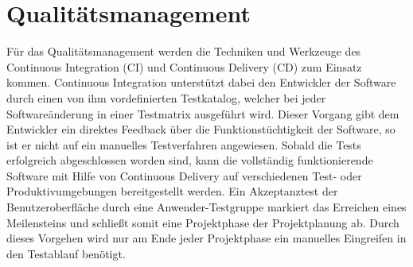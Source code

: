\section{Qualitätsmanagement}
Für das Qualitätsmanagement werden die Techniken und Werkzeuge des Continuous
Integration (CI) und Continuous Delivery (CD) zum Einsatz kommen. Continuous
Integration unterstützt dabei den Entwickler der Software durch einen von ihm
vordefinierten Testkatalog, welcher bei jeder Softwareänderung in einer
Testmatrix ausgeführt wird. Dieser Vorgang gibt dem Entwickler ein direktes
Feedback über die Funktionstüchtigkeit der Software, so ist er nicht auf ein
manuelles Testverfahren angewiesen. Sobald die Tests erfolgreich abgeschlossen
worden sind, kann die vollständig funktionierende Software mit Hilfe von
Continuous Delivery auf verschiedenen Test- oder Produktivumgebungen
bereitgestellt werden. Ein Akzeptanztest der Benutzeroberfläche durch eine
Anwender-Testgruppe markiert das Erreichen eines Meilensteins und schließt
somit eine Projektphase der Projektplanung ab. Durch dieses Vorgehen wird nur
am Ende jeder Projektphase ein manuelles Eingreifen in den Testablauf benötigt.

